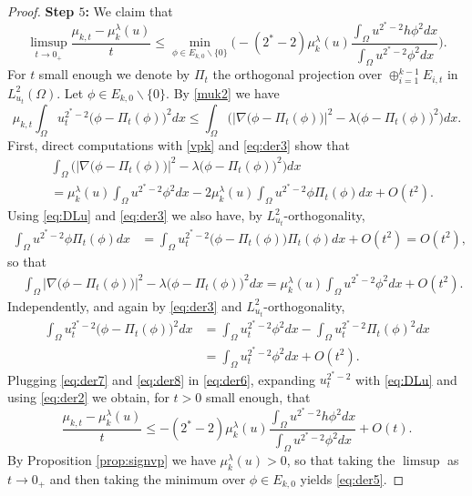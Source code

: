 \documentclass[10pt]{amsart}
\numberwithin{equation}{section}
\newcommand{\Om}{\Omega}
\newcommand{\mkl}{\mu_{k}^{\lambda}}
\theoremstyle{plain}
\theoremstyle{remark}
\begin{document}
\begin{proof}
 \textbf{Step $5$:} We claim that
 \begin{equation} \label{eq:der5}
\limsup_{t \to 0_+} \frac{\mu_{k,t} - \mkl(u)}{t}\le \min_{\phi \in E_{k,0}\backslash \{0\}} \Bigg( - (2^*-2) \mkl(u) \frac{\int_\Om u^{2^*-2}h \phi^2dx}{\int_\Om u^{2^*-2} \phi^2 dx}\Bigg).
\end{equation}
For $t$ small enough we denote by $\Pi_t$ the orthogonal projection over $\oplus_{i=1}^{k-1} E_{i,t}$ in $L^2_{u_t}(\Om)$. Let $\phi \in E_{k,0}\backslash \{0\}$. By \eqref{muk2} we have
\begin{equation} \label{eq:der6}
\mu_{k,t} \int_{\Om} u_t^{2^*-2}\big( \phi - \Pi_t(\phi) \big)^2dx \le \int_{\Om} \Big(\big| \nabla \big( \phi - \Pi_t(\phi)\big)\big|^2 - \lambda  \big( \phi - \Pi_t(\phi)\big)^2 \Big)dx.
\end{equation}
First, direct computations with \eqref{vpk} and \eqref{eq:der3} show that 
$$ \begin{aligned}
 &\int_{\Om} \Big(\big| \nabla \big( \phi - \Pi_t(\phi)\big)\big|^2 - \lambda  \big( \phi - \Pi_t(\phi)\big)^2 \Big)dx \\
 & = \mkl(u) \int_{\Om} u^{2^*-2}\phi^2 dx - 2 \mkl(u) \int_{\Om} u^{2^*-2} \phi \Pi_t(\phi)dx + O(t^2) .
\end{aligned} $$
Using \eqref{eq:DLu} and \eqref{eq:der3} we also have, by $L^2_{u_t}$-orthogonality,
$$ \begin{aligned}
 \int_{\Om} u^{2^*-2} \phi \Pi_t(\phi)dx & = \int_{\Om} u_t^{2^*-2} \big(\phi - \Pi_t(\phi) \big) \Pi_t(\phi) dx + O(t^2)  = O(t^2),
\end{aligned} $$
so that 
\begin{equation} \label{eq:der7}
 \begin{aligned}
 &\int_{\Om}\big| \nabla \big( \phi - \Pi_t(\phi)\big)\big|^2 - \lambda  \big( \phi - \Pi_t(\phi)\big)^2dx =\mkl(u) \int_{\Om} u^{2^*-2}\phi^2 dx + O(t^2) .
\end{aligned} 
\end{equation}
Independently, and again by \eqref{eq:der3} and $L^2_{u_t}$-orthogonality,
\begin{equation} \label{eq:der8}
 \begin{aligned}
 \int_{\Om} u_t^{2^*-2}\big( \phi - \Pi_t(\phi) \big)^2dx & =  \int_{\Om} u_t^{2^*-2} \phi^2dx - \int_{\Om} u_t^{2^*-2} \Pi_t(\phi)^2dx \\
 & =  \int_{\Om} u_t^{2^*-2} \phi^2dx  + O(t^2). 
 \end{aligned} 
\end{equation}
Plugging \eqref{eq:der7} and \eqref{eq:der8} in \eqref{eq:der6}, expanding $u_t^{2^*-2}$ with \eqref{eq:DLu} and using \eqref{eq:der2} we obtain, for $t>0$ small enough, that 
$$ \frac{\mu_{k,t} - \mkl(u)}{t}\le  - (2^*-2) \mkl(u) \frac{\int_\Om u^{2^*-2}h \phi^2dx}{\int_\Om u^{2^*-2} \phi^2 dx} + O(t).$$ 
By Proposition \ref{prop:signvp} we have $\mkl(u) >0$, so that taking the $\limsup$ as $t \to 0_+$ and then taking the minimum over $\phi \in E_{k,0}$ yields \eqref{eq:der5}. 


\end{proof}
\end{document}
